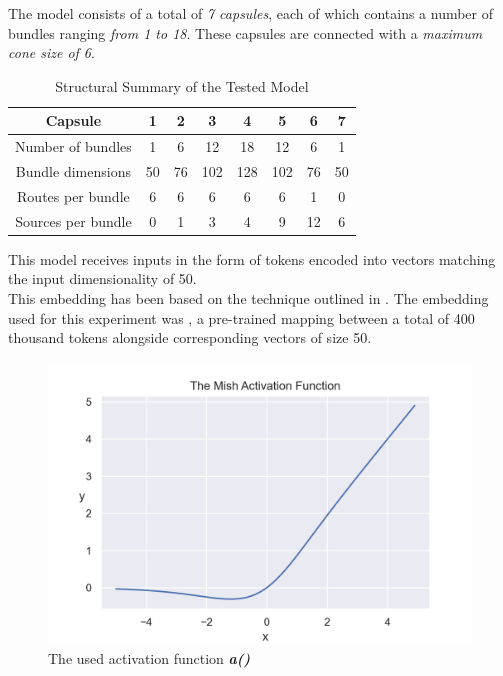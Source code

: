 The model consists of a total of \textit{7 capsules}, each of which contains
a number of bundles ranging \textit{from 1 to 18}.
These capsules are connected with a \textit{maximum cone size of 6}.


\begin{table}[h] 
\centering
 \begin{tabular}{||c || c c c c c c c ||} 
 \hline
   Capsule & 1 & 2 & 3 & 4 & 5 & 6 & 7 \\ [0.5ex] 
 \hline\hline
 Number of bundles & 1 & 6 & 12 & 18 & 12 & 6 & 1  \\ 
 \hline
 Bundle dimensions & 50 & 76 & 102 & 128 & 102 & 76 & 50  \\ 
 \hline
 Routes per bundle & 6 & 6 & 6 & 6 & 6 & 1 & 0 \\
 \hline
 Sources per bundle & 0 & 1 & 3 & 4 & 9 & 12 & 6 \\  
 \hline
\end{tabular}
\caption{Structural Summary of the Tested Model}   
\end{table}  

This model receives inputs in the form of tokens encoded into
vectors matching the input dimensionality of 50. \\

This embedding has been based on the technique outlined in \cite{web_embedding-howto}.
The embedding used for this experiment was \cite{web_embedding-glove},
a pre-trained mapping between a total of 400 thousand tokens 
alongside corresponding vectors of size 50.

\clearpage


\begin{figure}[h]
\centering
    \includegraphics[width=\textwidth*2/3]{PICs/Results/mish-activation.png}
    
    \caption{The used activation function \textit{\textbf{a()}}}
    \label{mish-function}
\end{figure}


